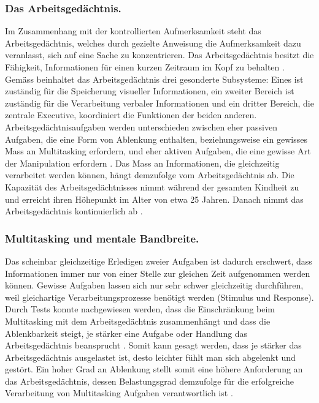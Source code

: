 \subsubsection{Das Arbeitsgedächtnis.} Im Zusammenhang mit der kontrollierten Aufmerksamkeit steht das Arbeitsgedächtnis, welches durch gezielte Anweisung die Aufmerksamkeit dazu veranlasst, sich auf eine Sache zu konzentrieren. Das Arbeitsgedächtnis besitzt die Fähigkeit, Informationen für einen kurzen Zeitraum im Kopf zu behalten \cite{Klingberg2008}. Gemäss  beinhaltet das Arbeitsgedächtnis drei gesonderte Subsysteme: Eines ist zuständig für die Speicherung visueller Informationen, ein zweiter Bereich ist zuständig für die Verarbeitung verbaler Informationen und ein dritter Bereich, die zentrale Executive, koordiniert die Funktionen der beiden anderen. Arbeitsgedächtnisaufgaben werden unterschieden zwischen eher passiven Aufgaben, die eine Form von Ablenkung enthalten, beziehungsweise ein gewisses Mass an Multitasking erfordern, und eher aktiven Aufgaben, die eine gewisse Art der Manipulation erfordern \cite{Klingberg2008}. Das Mass an Informationen, die gleichzeitig verarbeitet werden können, hängt demzufolge vom Arbeitsgedächtnis ab. Die Kapazität des Arbeitsgedächtnisses nimmt während der gesamten Kindheit zu und erreicht ihren Höhepunkt im Alter von etwa 25 Jahren. Danach nimmt das Arbeitsgedächtnis kontinuierlich ab \cite{Swanson1999}.
 
\subsubsection{Multitasking und mentale Bandbreite.} Das scheinbar gleichzeitige Erledigen zweier Aufgaben ist dadurch erschwert, dass Informationen immer nur von einer Stelle zur gleichen Zeit aufgenommen werden können. Gewisse Aufgaben lassen sich nur sehr schwer gleichzeitig durchführen, weil gleichartige Verarbeitungsprozesse  benötigt werden (Stimulus und Response)\cite{Klingberg2008}. Durch Tests konnte nachgewiesen werden, dass die Einschränkung beim Multitasking mit dem Arbeitsgedächtnis zusammenhängt und dass die Ablenkbarkeit steigt, je stärker eine Aufgabe oder Handlung das Arbeitsgedächtnis beansprucht \cite{Lavie2005}. Somit kann gesagt werden, dass je stärker das Arbeitsgedächtnis ausgelastet ist, desto leichter fühlt man sich abgelenkt und gestört. Ein hoher Grad an Ablenkung stellt somit eine höhere Anforderung an das Arbeitsgedächtnis, dessen Belastungsgrad demzufolge für die erfolgreiche Verarbeitung von Multitasking Aufgaben verantwortlich ist \cite{Klingberg2008}.

